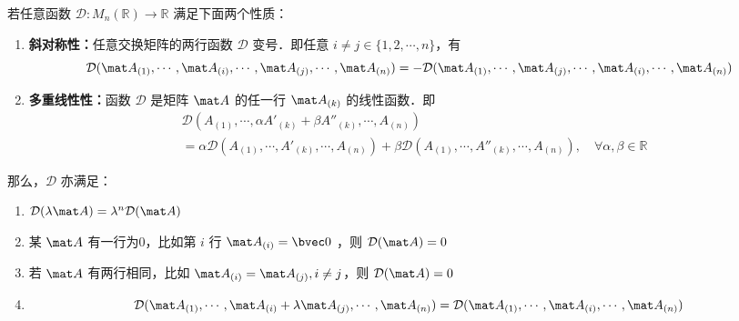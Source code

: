 \begin{lemma}{}
若任意函数 $\mathcal D:M_n(\mathbb R)\rightarrow \mathbb R$ 满足下面两个性质：
\begin{enumerate}
\item \textbf{斜对称性：}任意交换矩阵的两行函数 $\mathcal D$ 变号．即任意 $i\neq j\in \{1,2,\cdots,n\}$，有
\begin{equation}
\mathcal D(\mat A_{(1)},\cdots,\mat A_{(i)},\cdots,\mat A_{(j)},\cdots,\mat A_{(n)})=-\mathcal D(\mat A_{(1)},\cdots,\mat A_{(j)},\cdots,\mat A_{(i)},\cdots,\mat A_{(n)})
\end{equation}
\item \textbf{多重线性性：}函数 $\mathcal D$ 是矩阵 $\mat A$ 的任一行 $\mat A_{(k)}$ 的线性函数．即
\begin{equation}
\begin{aligned}
&\mathcal D(A_{(1)},\cdots,\alpha A'_{(k)}+\beta A''_{(k)},\cdots,A_{(n)})\\
&=\alpha\mathcal D(A_{(1)},\cdots,A'_{(k)},\cdots,A_{(n)})+\beta\mathcal D(A_{(1)},\cdots,A''_{(k)},\cdots,A_{(n)}),\quad\forall\alpha,\beta\in\mathbb R
\end{aligned}
\end{equation}
\end{enumerate}
那么，$\mathcal D$ 亦满足：
\begin{enumerate}
\item $\mathcal D(\lambda\mat A)=\lambda^n\mathcal D(\mat A)$
\item 某 $\mat A$ 有一行为0，比如第 $i$ 行 $\mat A_{(i)}=\bvec 0$ ，则 $\mathcal D(\mat A)=0$
\item 若 $\mat A$ 有两行相同，比如 $\mat A_{(i)}=\mat A_{(j)},i\neq j$，则 $\mathcal D(\mat A)=0$
\item \begin{equation}
\mathcal D(\mat A_{(1)},\cdots,\mat A_{(i)}+\lambda \mat A_{(j)},\cdots,\mat A_{(n)})=\mathcal D(\mat A_{(1)},\cdots,\mat A_{(i)},\cdots,\mat A_{(n)})
\end{equation}

\end{enumerate}

\end{lemma}
